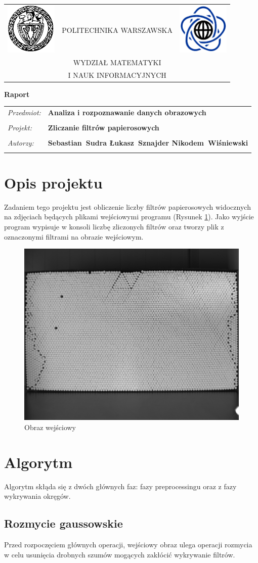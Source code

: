 \documentclass[12pt]{article}
\renewcommand{\maketitle}{
\begin{titlepage}
\begin{table}[t]
\centering
\begin{tabular}[t]{lcr}
 \includegraphics[width=70pt,height=70pt]{PW} & POLITECHNIKA WARSZAWSKA & \includegraphics[width=70pt,height=70pt]{MiNI}\\
& WYDZIAŁ MATEMATYKI & \\
& I NAUK INFORMACYJNYCH &
\end{tabular}
\end{table}
\vspace*{3cm}
  \begin{center}
    \LARGE
    \textbf {Raport}\\
   \vspace*{2 cm}
\begin{table}[!htp]
\begin{tabular}{p{4cm}p{10cm}}
\textit{Przedmiot:} &\textbf {Analiza i rozpoznawanie danych obrazowych} \\
\\
\textit{Projekt:} &\textbf {Zliczanie filtrów papierosowych} \\
\\
\textit{Autorzy:} &\textbf {Sebastian~Sudra \newline Łukasz~Sznajder \newline Nikodem~Wiśniewski} \\
\\
\end{tabular}
\end{table}

\vspace{5 cm}
  \center{\small Warszawa, dnia \today}
\end{center}
\end{titlepage}
}
\begin{document}
\maketitle

\newpage

\section{Opis projektu}
Zadaniem tego projektu jest obliczenie liczby filtrów papierosowych widocznych na zdjęciach będących plikami wejściowymi programu (Rysunek \ref{input}). Jako wyjście program wypisuje w konsoli liczbę zliczonych filtrów oraz tworzy plik z oznaczonymi filtrami na obrazie wejściowym.


\begin{figure}[H]
\centering \includegraphics[scale=0.3]{1.png}
\caption{Obraz wejściowy}
\label{input}
\end{figure}

\section{Algorytm}
Algorytm skłąda się z dwóch głównych faz: fazy preprocessingu oraz z fazy wykrywania okręgów.

\subsection{Rozmycie gaussowskie}
Przed rozpoczęciem głównych operacji, wejściowy obraz ulega operacji rozmycia w celu usunięcia drobnych szumów mogących zakłócić wykrywanie filtrów.
\end{document}
